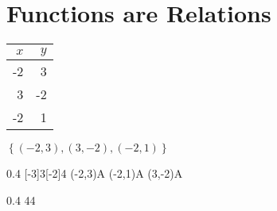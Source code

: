 \section{Functions are Relations}


\noindent
\begin{minipage}{0.2\textwidth}
    \centering
    \begin{tabular}{r|r}
        $x$ & $y$ \\
        \hline\hline
        -2 & 3 \\
        3 & -2 \\
        -2 & 1 \\
    \end{tabular}
\end{minipage}
\hfil
\begin{minipage}{0.2\textwidth}
    $
    \left\{
        (-2,3), (3,-2), (-2,1)
    \right\}
    $
\end{minipage}
\hfil
\begin{minipage}{0.2\textwidth}
    \centering
    \begin{myTikzpictureGrid}{0.4} [-3]{3}[-2]{4}
        \tkzDefPoint(-2,3){A} \myDrawPointA
        \tkzDefPoint(-2,1){A} \myDrawPointA
        \tkzDefPoint(3,-2){A} \myDrawPointA
    \end{myTikzpictureGrid}
\end{minipage}
\hfil
\begin{minipage}{0.2\textwidth}
    \centering
    \begin{myTikzpictureGrid}{0.4} {4}{4}
    \end{myTikzpictureGrid}
\end{minipage}
